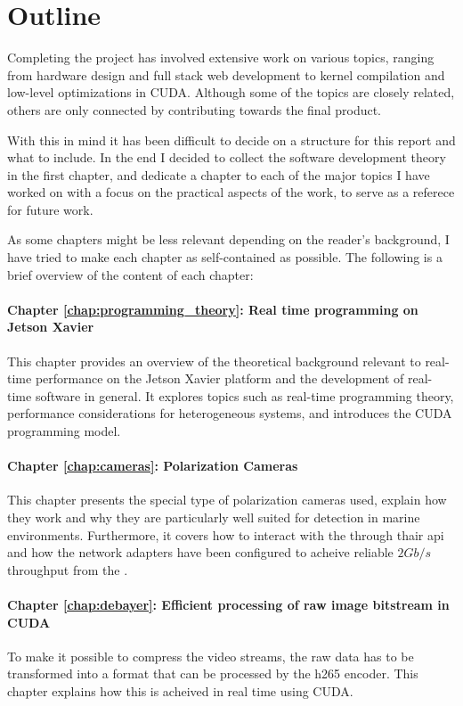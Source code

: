 \section{Outline}
Completing the \sr project has involved extensive work on various topics, ranging from hardware design and full stack web development to kernel compilation and low-level optimizations in CUDA.
Although some of the topics are closely related, others are only connected  by contributing towards the final product.

With this in mind it has been difficult to decide on a structure for this report and what to include.
In the end I decided to collect the software development theory in the first chapter, and dedicate a chapter to each of the major topics I have worked on with a focus on the practical aspects of the work, to serve as a referece for future work.

As some chapters might be less relevant depending on the reader's background, I have tried to make each chapter as self-contained as possible.
The following is a brief overview of the content of each chapter:

\paragraph{Chapter \ref{chap:programming_theory}: Real time programming on Jetson Xavier}
This chapter provides an overview of the theoretical background relevant to real-time performance on the Jetson Xavier platform and the development of real-time software in general. It explores topics such as real-time programming theory, performance considerations for heterogeneous systems, and introduces the CUDA programming model.

\paragraph{Chapter \ref{chap:cameras}: Polarization Cameras}
This chapter presents the special type of polarization cameras used, explain how they work and why they are particularly well suited for detection in marine environments.
Furthermore, it covers how to interact with the \cams through thair \gls{api} and how the network adapters have been configured to acheive reliable $2Gb/s$ throughput from the \cams.

\paragraph{Chapter \ref{chap:debayer}: Efficient processing of raw image bitstream in CUDA}
To make it possible to compress the video streams, the raw data has to be transformed into a format that can be processed by the \gls{h265} encoder.
This chapter explains how this is acheived in real time using CUDA.

